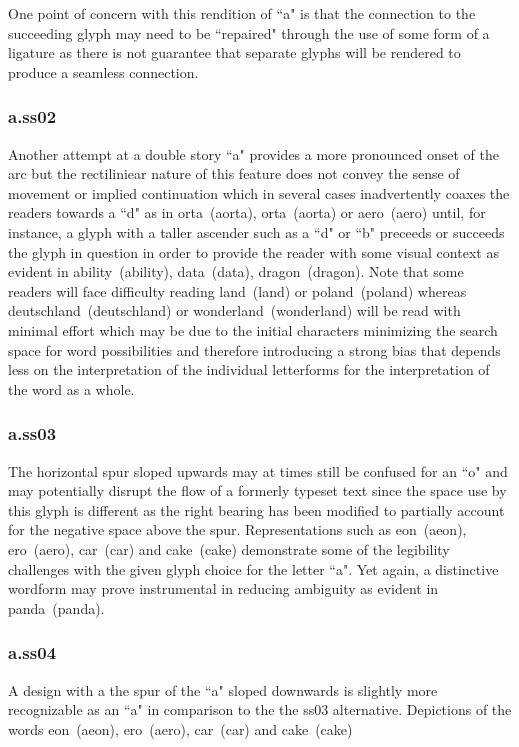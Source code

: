 One point of concern with this rendition of ``a" is that the connection to the
succeeding glyph may need to be ``repaired" through the use of some form of a
ligature as there is not guarantee that separate glyphs will be rendered to
produce a seamless connection.

\subsubsection{{\sstwo a}.ss02}

Another attempt at a double story ``a" provides a more pronounced onset of
the arc but the rectiliniear nature of this feature does not convey the sense
of movement or implied continuation which in several cases inadvertently coaxes
the readers towards a ``d" as in
\mbox{{orta} (aorta)},
\mbox{{ort{\sstwo a}} (aorta)} or
\mbox{{\sstwo aero} (aero)}
until, for instance, a glyph with a taller ascender such as a ``d" or ``b"
preceeds or succeeds the glyph in question in order to provide the reader with
some visual context as evident in
\mbox{{\sstwo ability} (ability)},
\mbox{{\sstwo data} (data)},
\mbox{{\sstwo dragon} (dragon)}. Note that some readers will face
difficulty reading \mbox{{\sstwo land} (land)} or
\mbox{{\sstwo poland} (poland)} whereas \mbox{{\sstwo deutschland} (deutschland)} or
\mbox{{\sstwo wonderland} (wonderland)}
will be read with minimal effort which may be due to the initial
characters minimizing the search space for word possibilities and therefore
introducing a strong bias that depends less on the interpretation of the
individual letterforms for the interpretation of the word as a whole.

\subsubsection{{\ssthree a}.ss03}
The horizontal spur sloped upwards may at times still be confused for an ``o"
and may potentially disrupt the flow of a formerly typeset text since
the space use by this glyph is different as the right bearing has been modified
to partially account for the negative space above the spur.
Representations such as
\mbox{{eon} (aeon)},
\mbox{{ero} (aero)},
\mbox{{\ssdefault c{\ssthree a}r} (car)} and
\mbox{{\ssdefault c{\ssthree a}ke} (cake)}
demonstrate some of the legibility challenges with the given glyph choice for
the letter ``a". Yet again, a distinctive wordform may prove instrumental in
reducing ambiguity as evident in
\mbox{{\ssdefault p{\ssthree a}nda} (panda)}.

\subsubsection{{\ssfour a}.ss04}
A design with a the spur of the ``a" sloped downwards is slightly more
recognizable as an ``a" in comparison to the the ss03 alternative. Depictions
of the words
\mbox{{eon} (aeon)},
\mbox{{ero} (aero)},
\mbox{{\ssdefault c{\ssfour a}r} (car)} and
\mbox{{\ssdefault c{\ssfour a}ke} (cake)}
